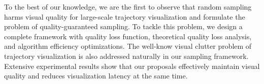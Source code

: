  To the best of our knowledge, we are the first to observe that random sampling harms visual quality for large-scale trajectory visualization and formulate the problem of quality-guaranteed sampling. To tackle this problem, we design a complete framework with quality loss function, theoretical quality loss analysis, and algorithm efficiency optimizations. The well-know visual clutter problem of trajectory visualization is also addressed naturally in our sampling framework. Extensive experimental results show that our proposals effectively maintain visual quality and reduces visualization latency at the same time.


%
